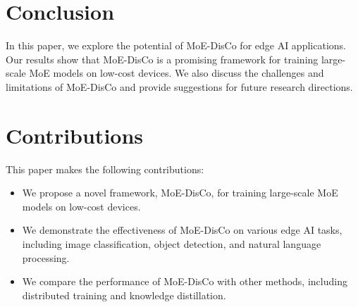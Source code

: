 \documentclass{article}
\begin{document}
\section{Conclusion}

In this paper, we explore the potential of MoE-DisCo for edge AI applications. Our results show that MoE-DisCo is a promising framework for training large-scale MoE models on low-cost devices. We also discuss the challenges and limitations of MoE-DisCo and provide suggestions for future research directions.

\section{Contributions}

This paper makes the following contributions:

\begin{itemize}
\item We propose a novel framework, MoE-DisCo, for training large-scale MoE models on low-cost devices.
\item We demonstrate the effectiveness of MoE-DisCo on various edge AI tasks, including image classification, object detection, and natural language processing.
\item We compare the performance of MoE-DisCo with other methods, including distributed training and knowledge distillation.
\end{itemize}
\end{document}
